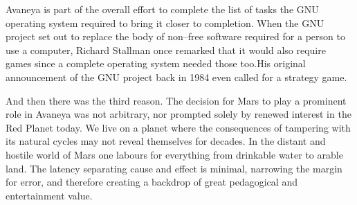 Avaneya is part of the overall effort to complete the list of tasks the GNU operating system required to bring it closer to completion. When the GNU project set out to replace the body of non--free software required for a person to use a computer, Richard Stallman once remarked that it would also require games since a complete operating system needed those too.  His original announcement of the GNU project back in 1984 even called for a strategy game.

And then there was the third reason. The decision for Mars to play a prominent role in Avaneya was not arbitrary, nor prompted solely by renewed interest in the Red Planet today. We live on a planet where the consequences of tampering with its natural cycles may not reveal themselves for decades. In the distant and hostile world of Mars one labours for everything from drinkable water to arable land. The latency separating cause and effect is minimal, narrowing the margin for error, and therefore creating a backdrop of great pedagogical and entertainment value.

\StopChapter


